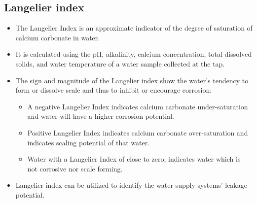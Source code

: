 \subsection{Langelier index}
\begin{itemize}
\item The Langelier Index is an approximate indicator of the degree of saturation of calcium carbonate in water. 
\item It is calculated using the pH, alkalinity, calcium concentration, total dissolved solids, and water temperature of a water sample collected at the tap.
\item The sign and magnitude of the Langelier index show the water’s tendency to form or dissolve scale and thus to inhibit or encourage corrosion:
\begin{itemize}
\item A negative Langelier Index indicates calcium carbonate under-saturation and water will have a higher corrosion potential.
\item Positive Langelier Index indicates  calcium carbonate over-saturation and indicates scaling potential of that water.
\item Water with a Langelier Index of close to zero, indicates water which is not corrosive nor scale forming.
\end{itemize}
\item Langelier index can be utilized to identify the water supply systems' leakage potential.
\end{itemize}

